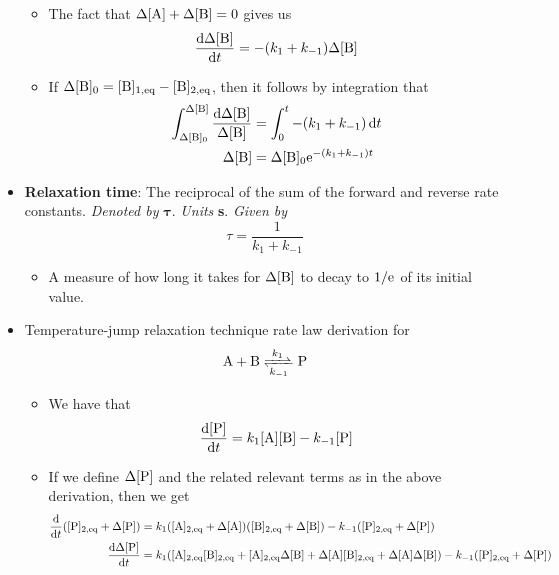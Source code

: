 \documentclass[../notes.tex]{subfiles}
\begin{document}
\begin{itemize}
\begin{itemize}
        \item The fact that $\Delta[\ce{A}]+\Delta[\ce{B}]=0$ gives us
        \begin{equation*}
            \dv{\Delta[\ce{B}]}{t} = -(k_1+k_{-1})\Delta[\ce{B}]
        \end{equation*}
        \item If $\Delta[\ce{B}]_0=[\ce{B}]_{1,\text{eq}}-[\ce{B}]_{2,\text{eq}}$, then it follows by integration that
        \begin{align*}
            \int_{\Delta[\ce{B}]_0}^{\Delta[\ce{B}]}\frac{\dd{\Delta[\ce{B}]}}{\Delta[\ce{B}]} &= \int_0^t-(k_1+k_{-1})\dd{t}\\
            \Delta[\ce{B}] &= \Delta[\ce{B}]_0\e[-(k_1+k_{-1})t]
        \end{align*}
    \end{itemize}
    \item \textbf{Relaxation time}: The reciprocal of the sum of the forward and reverse rate constants. \emph{Denoted by} $\bm{\tau}$. \emph{Units} \textbf{s}. \emph{Given by}
    \begin{equation*}
        \tau = \frac{1}{k_1+k_{-1}}
    \end{equation*}
    \begin{itemize}
        \item A measure of how long it takes for $\Delta[\ce{B}]$ to decay to $1/\text{e}^{}$ of its initial value.
    \end{itemize}
    \item Temperature-jump relaxation technique rate law derivation for
    \begin{equation*}
        \ce{A + B <=>[$k_1$][$k_{-1}$] P}
    \end{equation*}
    \begin{itemize}
        \item We have that
        \begin{equation*}
            \dv{[\ce{P}]}{t} = k_1[\ce{A}][\ce{B}]-k_{-1}[\ce{P}]
        \end{equation*}
        \item If we define $\Delta[\ce{P}]$ and the related relevant terms as in the above derivation, then we get
        \begin{align*}
            \dv{t}([\ce{P}]_{2,\text{eq}}+\Delta[\ce{P}]) &= k_1([\ce{A}]_{2,\text{eq}}+\Delta[\ce{A}])([\ce{B}]_{2,\text{eq}}+\Delta[\ce{B}])-k_{-1}([\ce{P}]_{2,\text{eq}}+\Delta[\ce{P}])\\
            \dv{\Delta[\ce{P}]}{t} &= k_1([\ce{A}]_{2,\text{eq}}[\ce{B}]_{2,\text{eq}}+[\ce{A}]_{2,\text{eq}}\Delta[\ce{B}]+\Delta[\ce{A}][\ce{B}]_{2,\text{eq}}+\Delta[\ce{A}]\Delta[\ce{B}])-k_{-1}([\ce{P}]_{2,\text{eq}}+\Delta[\ce{P}])\\

\end{align*}
\end{itemize}
\end{itemize}
\end{document}
